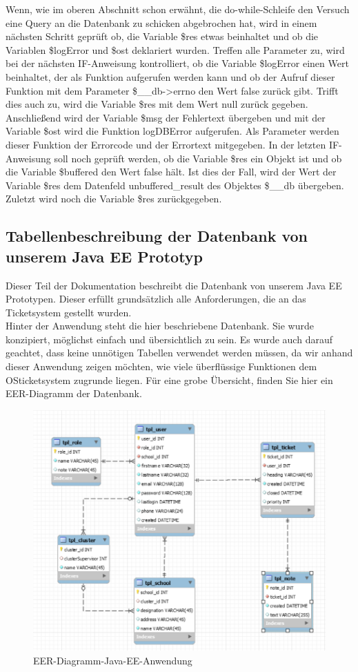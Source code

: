 Wenn, wie im oberen Abschnitt schon erwähnt, die do-while-Schleife den Versuch eine Query an die Datenbank zu schicken abgebrochen hat, wird in einem nächsten Schritt geprüft ob, die Variable \$res etwas beinhaltet und ob die Variablen \$logError und \$ost deklariert wurden. Treffen alle Parameter zu, wird bei der nächsten IF-Anweisung kontrolliert, ob die Variable \$logError einen Wert beinhaltet, der als Funktion aufgerufen werden kann und ob der Aufruf dieser Funktion mit dem Parameter \$\_\_db->errno den Wert false zurück gibt.
Trifft dies auch zu, wird die Variable \$res mit dem Wert null zurück gegeben. Anschließend wird der Variable \$msg der Fehlertext übergeben und mit der Variable \$ost  wird die Funktion logDBError aufgerufen. Als Parameter werden dieser Funktion der Errorcode und der Errortext mitgegeben.
In der letzten IF-Anweisung soll noch geprüft werden, ob die Variable \$res ein Objekt ist und ob die Variable \$buffered den Wert false hält. Ist dies der Fall, wird der Wert der Variable \$res dem Datenfeld unbuffered\_result des Objektes \$\_\_db übergeben. 
Zuletzt wird noch die Variable \$res zurückgegeben.
\newpage

\subsection{Tabellenbeschreibung der Datenbank von unserem Java EE Prototyp}
Dieser Teil der Dokumentation beschreibt die Datenbank von unserem Java EE Prototypen. Dieser erfüllt grundsätzlich alle Anforderungen, die an das Ticketsystem gestellt wurden.\\
Hinter der Anwendung steht die hier beschriebene Datenbank. Sie wurde konzipiert, möglichst einfach und übersichtlich zu sein. Es wurde auch darauf geachtet, dass keine unnötigen Tabellen verwendet werden müssen, da wir anhand dieser Anwendung zeigen möchten, wie viele überflüssige Funktionen dem OSticketsystem zugrunde liegen.
Für eine grobe Übersicht, finden Sie hier ein EER-Diagramm der Datenbank.
\begin{figure}[h]
	\centering
	\includegraphics[scale=.8]{figures/EER-Diagramm-Java-EE-Anwendung.PNG}
	\caption{EER-Diagramm-Java-EE-Anwendung}
	\label{EER-Diagramm-Java-EE-Anwendung}
\end{figure}

